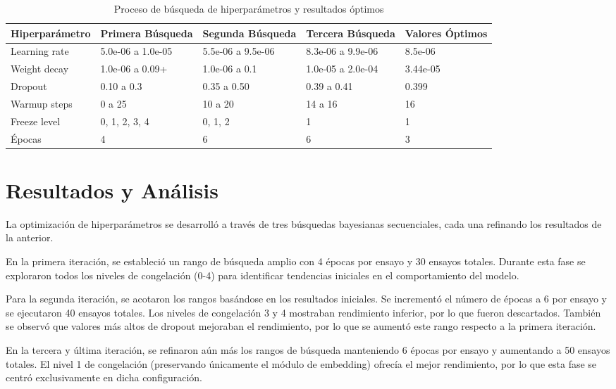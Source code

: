 \begin{table}[htbp]
    \centering
    \caption{Proceso de búsqueda de hiperparámetros y resultados óptimos}
    \label{tabla:hiperparametros}
    \begin{tabular}{|l|p{2.6cm}|p{2.6cm}|p{2.6cm}|p{2cm}|}
        \hline
        \textbf{Hiperparámetro} & \textbf{Primera Búsqueda} & \textbf{Segunda Búsqueda} & \textbf{Tercera Búsqueda} & \textbf{Valores Óptimos} \\
        \hline
        Learning rate & 5.0e-06 a 1.0e-05 & 5.5e-06 a 9.5e-06 & 8.3e-06 a 9.9e-06 & 8.5e-06 \\
        \hline
        Weight decay & 1.0e-06 a 0.09+ & 1.0e-06 a 0.1 & 1.0e-05 a 2.0e-04 & 3.44e-05 \\
        \hline
        Dropout & 0.10 a 0.3 & 0.35 a 0.50 & 0.39 a 0.41 & 0.399 \\
        \hline
        Warmup steps & 0 a 25 & 10 a 20 & 14 a 16 & 16 \\
        \hline
        Freeze level & 0, 1, 2, 3, 4 & 0, 1, 2 & 1 & 1 \\
        \hline
        Épocas & 4 & 6 & 6 & 3 \\
        \hline
    \end{tabular}
\end{table}

\section{Resultados y Análisis}
La optimización de hiperparámetros se desarrolló a través de tres búsquedas bayesianas secuenciales, cada una refinando los resultados de la anterior.

En la primera iteración, se estableció un rango de búsqueda amplio con 4 épocas por ensayo y 30 ensayos totales. Durante esta fase se exploraron todos los niveles de congelación (0-4) para identificar tendencias iniciales en el comportamiento del modelo.

Para la segunda iteración, se acotaron los rangos basándose en los resultados iniciales. Se incrementó el número de épocas a 6 por ensayo y se ejecutaron 40 ensayos totales. Los niveles de congelación 3 y 4 mostraban rendimiento inferior, por lo que fueron descartados. También se observó que valores más altos de dropout mejoraban el rendimiento, por lo que se aumentó este rango respecto a la primera iteración.

En la tercera y última iteración, se refinaron aún más los rangos de búsqueda manteniendo 6 épocas por ensayo y aumentando a 50 ensayos totales. El nivel 1 de congelación (preservando únicamente el módulo de embedding) ofrecía el mejor rendimiento, por lo que esta fase se centró exclusivamente en dicha configuración.

